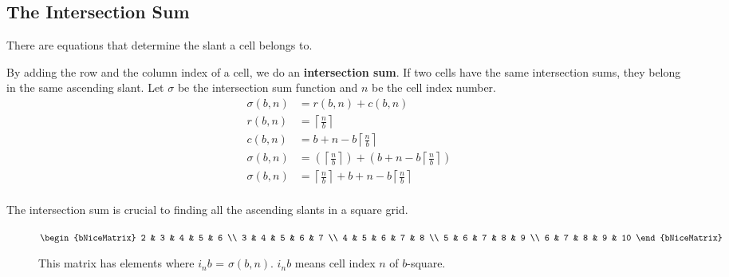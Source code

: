 \documentclass[letterpaper, twoside,12pt]{article}
\begin{document}
    \subsection{The Intersection Sum} \label{intersection_sum}
    There are equations that determine the slant a cell belongs to.

    By adding the row and the column index of a cell, we do an \textbf{intersection sum}. If two cells have the same intersection sums, they belong in the same ascending slant. Let $\sigma$ be the intersection sum function and $n$ be the cell index number.
    \begin{equation}
        \begin{split}
            \sigma(b,n) &= r(b,n) + c(b,n) \\
            r(b,n) &= \left\lceil \frac{n}{b} \right\rceil \\
            c(b,n) &= b + n - b\left\lceil \frac{n}{b} \right\rceil \\
            \sigma(b,n) &= ( \left\lceil \frac{n}{b} \right\rceil ) + (b + n - b\left\lceil \frac{n}{b} \right\rceil)\\
            \sigma(b,n) &= \left\lceil \frac{n}{b} \right\rceil + b + n - b\left\lceil \frac{n}{b} \right\rceil\\
        \end{split}
    \end{equation}

    The intersection sum is crucial to finding all the ascending slants in a square grid.
    \begin{figure}[ht]
        \centering
        {$
        \begin{bNiceMatrix}
            2 & 3 & 4 & 5 & 6 \\
            3 & 4 & 5 & 6 & 7 \\
            4 & 5 & 6 & 7 & 8 \\
            5 & 6 & 7 & 8 & 9 \\
            6 & 7 & 8 & 9 & 10
        \end{bNiceMatrix}
        $}
        \caption{This matrix has elements where $i_{n}b$ = $\sigma(b,n)$. $i_{n}b$ means cell index $n$ of $b$-square.}
    \end{figure}
\end{document}
